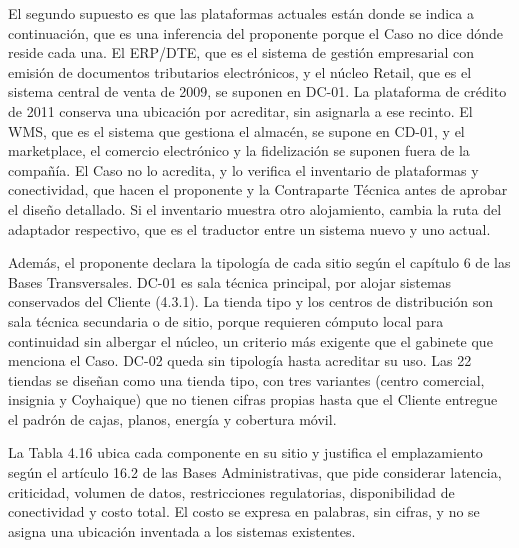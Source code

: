 \documentclass[11pt]{article}
\begin{document}
El segundo supuesto es que las plataformas actuales están donde se indica a continuación, que es una inferencia del proponente porque el Caso no dice dónde reside cada una. El ERP/DTE, que es el sistema de gestión empresarial con emisión de documentos tributarios electrónicos, y el núcleo Retail, que es el sistema central de venta de 2009, se suponen en DC-01. La plataforma de crédito de 2011 conserva una ubicación por acreditar, sin asignarla a ese recinto. El WMS, que es el sistema que gestiona el almacén, se supone en CD-01, y el marketplace, el comercio electrónico y la fidelización se suponen fuera de la compañía. El Caso no lo acredita, y lo verifica el inventario de plataformas y conectividad, que hacen el proponente y la Contraparte Técnica antes de aprobar el diseño detallado. Si el inventario muestra otro alojamiento, cambia la ruta del adaptador respectivo, que es el traductor entre un sistema nuevo y uno actual.

Además, el proponente declara la tipología de cada sitio según el capítulo 6 de las Bases Transversales. DC-01 es sala técnica principal, por alojar sistemas conservados del Cliente (4.3.1). La tienda tipo y los centros de distribución son sala técnica secundaria o de sitio, porque requieren cómputo local para continuidad sin albergar el núcleo, un criterio más exigente que el gabinete que menciona el Caso. DC-02 queda sin tipología hasta acreditar su uso. Las 22 tiendas se diseñan como una tienda tipo, con tres variantes (centro comercial, insignia y Coyhaique) que no tienen cifras propias hasta que el Cliente entregue el padrón de cajas, planos, energía y cobertura móvil.

La Tabla 4.16 ubica cada componente en su sitio y justifica el emplazamiento según el artículo 16.2 de las Bases Administrativas, que pide considerar latencia, criticidad, volumen de datos, restricciones regulatorias, disponibilidad de conectividad y costo total. El costo se expresa en palabras, sin cifras, y no se asigna una ubicación inventada a los sistemas existentes.

\par\vspace{0pt plus 10\baselineskip}\vspace{0pt plus -10\baselineskip}
\end{document}

